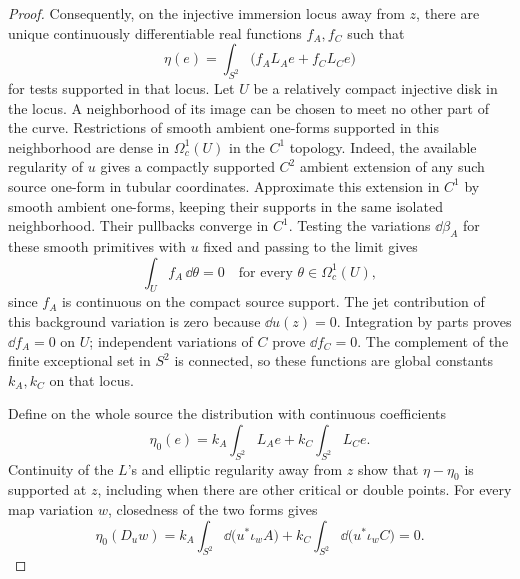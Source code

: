\begin{proof}
Consequently, on the injective immersion locus away from $z$, there
are unique continuously differentiable real functions $f_A,f_C$ such that
\begin{equation}\label{eq:pencil-annihilator-coefficients}
 \eta(e)=\int_{S^2}\bigl(f_A L_Ae+f_C L_Ce\bigr)
\end{equation}
for tests supported in that locus.  Let $U$ be a relatively compact
injective disk in the locus.  A neighborhood of its image can be
chosen to meet no other part of the curve.  Restrictions of smooth
ambient one-forms supported in this neighborhood are dense in
$\Omega^1_c(U)$ in the $C^1$ topology.  Indeed, the available regularity
of $u$ gives a compactly supported $C^2$ ambient extension of any such
source one-form in tubular coordinates.  Approximate this extension
in $C^1$ by smooth ambient one-forms, keeping their supports in the
same isolated neighborhood.  Their pullbacks converge in $C^1$.
Testing the variations $\dd\beta_A$ for these smooth primitives with
$u$ fixed and passing to the limit gives
\[
 \int_U f_A\,\dd\theta=0
 \quad\text{for every }\theta\in\Omega^1_c(U),
\]
since $f_A$ is continuous on the compact source support.
The jet contribution of this background variation is zero because
$\dd u(z)=0$.  Integration by parts proves $\dd f_A=0$ on $U$;
independent variations of $C$ prove $\dd f_C=0$.  The complement of
the finite exceptional set in $S^2$ is connected, so these functions
are global constants $k_A,k_C$ on that locus.

Define on the whole source the distribution with continuous coefficients
\[
 \eta_0(e)=k_A\int_{S^2}L_Ae+k_C\int_{S^2}L_Ce.
\]
Continuity of the $L$'s and elliptic regularity away from $z$ show
that $\eta-\eta_0$ is supported at $z$, including when there are other
critical or double points.  For every map variation $w$, closedness
of the two forms gives
\[
 \eta_0(D_uw)
 =k_A\int_{S^2}\dd\bigl(u^*\iota_wA\bigr)
  +k_C\int_{S^2}\dd\bigl(u^*\iota_wC\bigr)=0.
\]


\end{proof}
